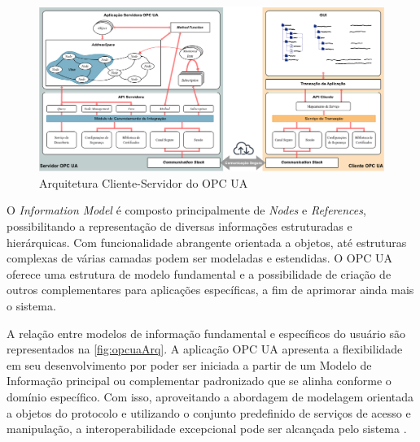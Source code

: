         \begin{figure}[htbp]
            \caption{Arquitetura Cliente-Servidor do OPC UA}
            \label{fig:opcuaArqCS}
            \begin{center}
                \includegraphics[width=1\linewidth]{USPSC-img/opcuaClientServerArc1-low.png}
            \end{center}
        \end{figure}

        O \textit{Information Model} é composto principalmente de \textit{Nodes} e \textit{References}, possibilitando a representação de diversas informações estruturadas e hierárquicas. Com funcionalidade abrangente orientada a objetos, até estruturas complexas de várias camadas podem ser modeladas e estendidas. O OPC UA oferece uma estrutura de modelo fundamental e a possibilidade de criação de outros complementares para aplicações específicas, a fim de aprimorar ainda mais o sistema.

        A relação entre modelos de informação fundamental e específicos do usuário são representados na \autoref{fig:opcuaArq}. A aplicação OPC UA apresenta a flexibilidade em seu desenvolvimento por poder ser iniciada a partir de um Modelo de Informação principal ou complementar padronizado que se alinha conforme o domínio específico. Com isso, aproveitando a abordagem de modelagem orientada a objetos do protocolo e utilizando o conjunto predefinido de serviços de acesso e manipulação, a interoperabilidade excepcional pode ser alcançada pelo sistema \cite{gong2020}.

